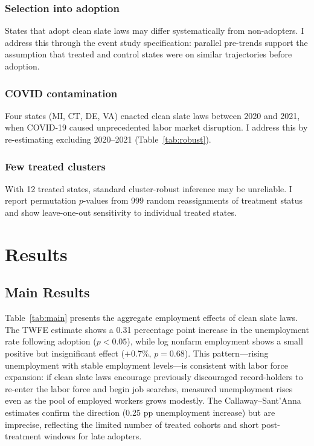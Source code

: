 \documentclass[12pt]{article}
\begin{document}
\subsubsection*{Selection into adoption} States that adopt clean slate laws may differ systematically from non-adopters. I address this through the event study specification: parallel pre-trends support the assumption that treated and control states were on similar trajectories before adoption.

\subsubsection*{COVID contamination} Four states (MI, CT, DE, VA) enacted clean slate laws between 2020 and 2021, when COVID-19 caused unprecedented labor market disruption. I address this by re-estimating excluding 2020--2021 (Table~\ref{tab:robust}).

\subsubsection*{Few treated clusters} With 12 treated states, standard cluster-robust inference may be unreliable. I report permutation $p$-values from 999 random reassignments of treatment status and show leave-one-out sensitivity to individual treated states.

\section{Results}

\subsection{Main Results}



Table~\ref{tab:main} presents the aggregate employment effects of clean slate laws. The TWFE estimate shows a 0.31 percentage point increase in the unemployment rate following adoption ($p < 0.05$), while log nonfarm employment shows a small positive but insignificant effect ($+0.7\%$, $p = 0.68$). This pattern---rising unemployment with stable employment levels---is consistent with labor force expansion: if clean slate laws encourage previously discouraged record-holders to re-enter the labor force and begin job searches, measured unemployment rises even as the pool of employed workers grows modestly. The Callaway--Sant'Anna estimates confirm the direction (0.25 pp unemployment increase) but are imprecise, reflecting the limited number of treated cohorts and short post-treatment windows for late adopters.
\end{document}
